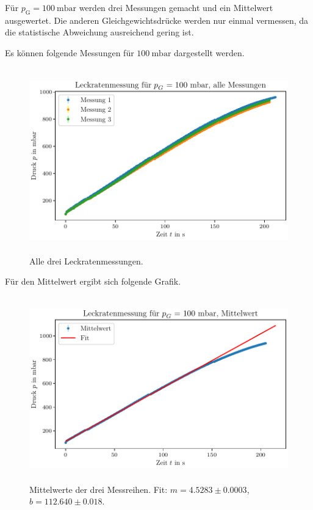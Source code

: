 Für $p_\text{G} = \SI{100}{\milli\bar}$ werden drei Messungen gemacht und ein Mittelwert ausgewertet. Die anderen Gleichgewichtsdrücke werden nur einmal vermessen, da die statistische Abweichung ausreichend gering ist.

Es können folgende Messungen für $\SI{100}{\milli\bar}$ dargestellt werden.

\begin{figure}[H]
    \centering
    \includegraphics[width=\textwidth,height=8cm]{plots/DP_Leck_100mbar_alle.pdf}
    \caption{Alle drei Leckratenmessungen.}
    \label{fig:DP_leck_100mbar_alle}
\end{figure}

Für den Mittelwert ergibt sich folgende Grafik.

\begin{figure}[H]
    \centering
    \includegraphics[width=\textwidth,height=8cm]{plots/DP_Leck1_100mbar_mittelwert.pdf}
    \caption{Mittelwerte der drei Messreihen. Fit: $m = \num{4.5283} \pm \num{0.0003}$, $b = \num{112.640} \pm \num{0.018}$.}
    \label{fig:DP_Leck_100mbar_mittelwert}
\end{figure}

